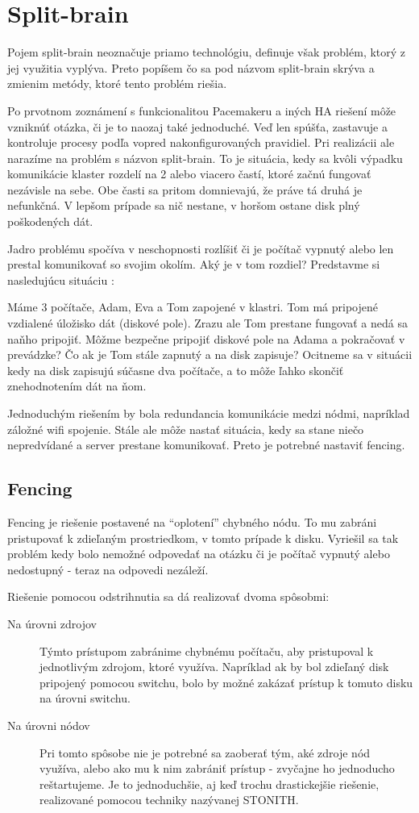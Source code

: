 \section{Split-brain}
Pojem split-brain neoznačuje priamo technológiu, definuje však problém, ktorý z jej využitia vyplýva. Preto popíšem čo sa pod názvom split-brain skrýva a zmienim metódy, ktoré tento problém riešia.

Po prvotnom zoznámení s funkcionalitou Pacemakeru a iných HA riešení môže vzniknúť otázka, či je to naozaj také jednoduché. Veď len spúšťa, zastavuje a kontroluje procesy podľa vopred nakonfigurovaných pravidiel. Pri realizácii ale narazíme na problém s názvon split-brain. To je situácia, kedy sa kvôli výpadku komunikácie klaster rozdelí na 2 alebo viacero častí, ktoré začnú fungovať nezávisle na sebe. Obe časti sa pritom domnievajú, že práve tá druhá je nefunkčná. V lepšom prípade sa nič nestane, v horšom ostane disk plný poškodených dát.

Jadro problému spočíva v neschopnosti rozlíšiť či je počítač vypnutý alebo len prestal komunikovať so svojim okolím. Aký je v tom rozdiel? Predstavme si nasledujúcu situáciu \cite{web:split-brain-quo}:

Máme 3 počítače, Adam, Eva a Tom zapojené v klastri. Tom má pripojené vzdialené úložisko dát (diskové pole). Zrazu ale Tom prestane fungovať a nedá sa naňho pripojiť. Môžme bezpečne pripojiť diskové pole na Adama a pokračovať v prevádzke? Čo ak je Tom stále zapnutý a na disk zapisuje? Ocitneme sa v situácii kedy na disk zapisujú súčasne dva počítače, a to môže ľahko skončiť znehodnotením dát na ňom.

Jednoduchým riešením by bola redundancia komunikácie medzi nódmi, napríklad záložné wifi spojenie. Stále ale môže nastať situácia, kedy sa stane niečo nepredvídané a server prestane komunikovať. Preto je potrebné nastaviť fencing.

\subsection{Fencing}
Fencing je riešenie postavené na "`oplotení"' chybného nódu. To mu zabráni pristupovať k zdieľaným prostriedkom, v tomto prípade k disku. Vyriešil sa tak problém kedy bolo nemožné odpovedať na otázku či je počítač vypnutý alebo nedostupný - teraz na odpovedi nezáleží.

Riešenie pomocou odstrihnutia sa dá realizovať dvoma spôsobmi:
\begin{description}
	\item[Na úrovni zdrojov] Týmto prístupom zabránime chybnému počítaču, aby pristupoval k jednotlivým zdrojom, ktoré využíva. Napríklad ak by bol zdieľaný disk pripojený pomocou switchu, bolo by možné zakázať prístup k tomuto disku na úrovni switchu.
	\item[Na úrovni nódov] Pri tomto spôsobe nie je potrebné sa zaoberať tým, aké zdroje nód využíva, alebo ako mu k nim zabrániť prístup - zvyčajne ho jednoducho reštartujeme. Je to jednoduchšie, aj keď trochu drastickejšie riešenie, realizované pomocou techniky nazývanej \ac{STONITH}. 
\end{description}

